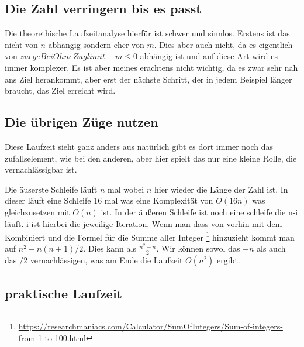 \documentclass[a4paper,10pt,ngerman]{scrartcl}
\begin{document}
\subsection{Die Zahl verringern bis es passt}

Die theorethische Laufzeitanalyse hierfür ist schwer und sinnlos. Erstens ist das nicht von $n$ abhängig sondern eher von $m$. Dies aber auch nicht, da es eigentlich von $zuegeBeiOhneZuglimit - m \leq 0$ abhängig ist und auf diese Art wird es immer komplexer. Es ist aber meines erachtens nicht wichtig, da es zwar sehr nah ans Ziel herankommt, aber erst der nächste Schritt, der in jedem Beispiel länger braucht, das Ziel erreicht wird.

\subsection{Die übrigen Züge nutzen}

Diese Laufzeit sieht ganz anders aus natürlich gibt es dort immer noch das zufallselement, wie bei den anderen, aber hier spielt das nur eine kleine Rolle, die vernachlässigbar ist.

Die äuserste Schleife läuft $n$ mal wobei $n$ hier wieder die Länge der Zahl ist. In dieser läuft eine Schleife 16 mal was eine Komplexität von $O(16n)$ was gleichzusetzen mit $O(n)$ ist. In der äußeren Schleife ist noch eine schleife die n-i läuft. i ist hierbei die jeweilige Iteration. 
Wenn man dass von vorhin mit dem Kombiniert und die Formel für die Summe aller Integer \footnote{\url{https://researchmaniacs.com/Calculator/SumOfIntegers/Sum-of-integers-from-1-to-100.html}} hinzuzieht kommt man auf $n^2 - n(n+1)/2$. Dies kann als $\frac{n^2 - n}{2}$. Wir können sowol das $-n$ als auch das $/2$ vernachlässigen, was am Ende die Laufzeit $O(n^2)$ ergibt.

\subsection{praktische Laufzeit}
\end{document}
